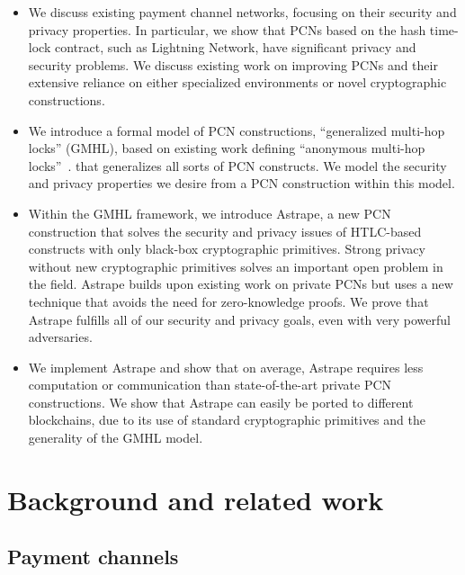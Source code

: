 \documentclass[USenglish,oneside,twocolumn]{article}
\begin{document}
\begin{itemize}
    \item We discuss existing payment channel networks, focusing on their security and privacy properties. In particular, we show that PCNs based on the hash time-lock contract, such as Lightning Network, have significant privacy and security problems. We discuss existing work on improving PCNs and their extensive reliance on either specialized environments or novel cryptographic constructions.
    \item We introduce a formal model of PCN constructions, ``generalized multi-hop locks'' (GMHL), based on existing work defining ``anonymous multi-hop locks''~\cite{malavolta2019anonymous}. that generalizes all sorts of PCN constructs. We model the security and privacy properties we desire from a PCN construction within this model.
    \item Within the GMHL framework, we introduce Astrape, a new PCN construction that solves the security and privacy issues of HTLC-based constructs with only black-box cryptographic primitives. Strong privacy without new cryptographic primitives solves an important open problem in the field. Astrape builds upon existing work \cite{malavolta2017concurrency} on private PCNs but uses a new technique that avoids the need for zero-knowledge proofs. We prove that Astrape fulfills all of our security and privacy goals, even with very powerful adversaries.
    \item We implement Astrape and show that on average, Astrape requires less computation or communication than state-of-the-art private PCN constructions. We show that Astrape can easily be ported to different blockchains, due to its use of standard cryptographic primitives and the generality of the GMHL model.
\end{itemize}


\section{Background and related work} \label{sec:bg}

\subsection{Payment channels}
\end{document}

